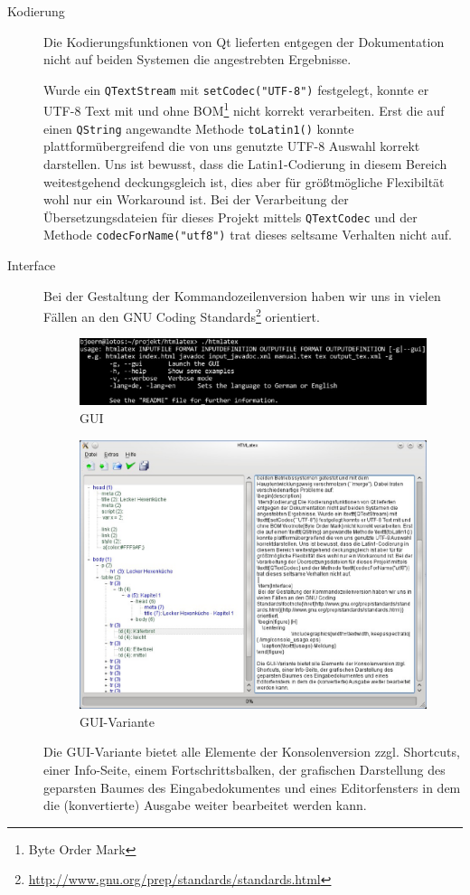 \documentclass[	a4paper,		%
		titlepage, 		%
		fontsize=12pt		%
		]{scrartcl} 		%
\begin{document}
\begin{description}
 \item[Kodierung] Die Kodierungsfunktionen von Qt lieferten entgegen der Dokumentation nicht auf beiden Systemen die angestrebten Ergebnisse.

 Wurde ein \texttt{QTextStream} mit \texttt{setCodec("UTF-8")} festgelegt, konnte er UTF-8 Text mit und ohne BOM\footnote{Byte Order Mark} nicht korrekt verarbeiten. Erst die auf einen \texttt{QString} angewandte Methode \texttt{toLatin1()} konnte plattformübergreifend die von uns genutzte UTF-8 Auswahl korrekt darstellen. Uns ist bewusst, dass die Latin1-Codierung in diesem Bereich weitestgehend deckungsgleich ist, dies aber für größtmögliche Flexibiltät wohl nur ein Workaround ist. Bei der Verarbeitung der Übersetzungsdateien für dieses Projekt mittels \texttt{QTextCodec} und der Methode \texttt{codecForName("utf8")} trat dieses seltsame Verhalten nicht auf.

 \item[Interface]
 Bei der Gestaltung der Kommandozeilenversion haben wir uns in vielen Fällen an den GNU Coding Standards\footnote{\href{http://www.gnu.org/prep/standards/standards.html}{http://www.gnu.org/prep/standards/standards.html}} orientiert.
 \begin{figure} [H]
    \centering
	\includegraphics[width=\textwidth, keepaspectratio]{./img/console_usage.eps}
    \caption{GUI}
\end{figure}

 \begin{figure} [H]
    \centering
	\includegraphics[width=.7\textwidth, keepaspectratio]{./img/GUI.eps}
    \caption{GUI-Variante}
\end{figure}
Die GUI-Variante bietet alle Elemente der Konsolenversion zzgl. Shortcuts, einer Info-Seite, einem Fortschrittsbalken, der grafischen Darstellung des geparsten Baumes des Eingabedokumentes und eines Editorfensters in dem die (konvertierte) Ausgabe weiter bearbeitet werden kann.


\end{description}
\end{document}
